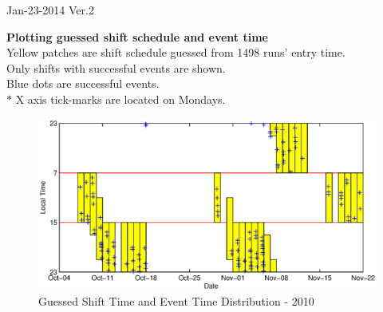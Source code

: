 \documentclass[a4paper,11pt]{article}
\begin{document}
\pagestyle{empty}

\begin{rightline}
{Jan-23-2014 Ver.2}
\end{rightline}
\noindent
\textbf{Plotting guessed shift schedule and event time}\\

\noindent
Yellow patches are shift schedule guessed from 1498 runs' entry time.\\
Only shifts with successful events are shown.\\
Blue dots are successful events.\\

\noindent
$\ast$ X axis tick-marks are located on Mondays.

\begin{figure}[htbp]
\begin{center}
\includegraphics[width =13cm]{PlotTime2010.eps}
\caption{Guessed Shift Time and Event Time Distribution - 2010}
\end{center}
\label{2010}
\end{figure}
\end{document}
